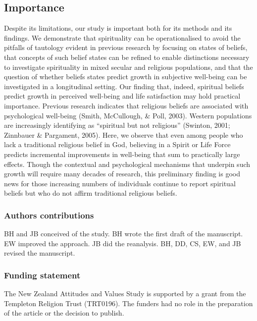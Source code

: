 \documentclass[
  english,
  man,floatsintext]{apa6}
\begin{document}
\hypertarget{importance}{%
\subsection{Importance}\label{importance}}

Despite its limitations, our study is important both for its methods and its findings. We demonstrate that spirituality can be operationalised to avoid the pitfalls of tautology evident in previous research by focusing on states of beliefs, that concepts of such belief states can be refined to enable distinctions necessary to investigate spirituality in mixed secular and religious populations, and that the question of whether beliefs states predict growth in subjective well-being can be investigated in a longitudinal setting. Our finding that, indeed, spiritual beliefs predict growth in perceived well-being and life satisfaction may hold practical importance. Previous research indicates that religious beliefs are associated with psychological well-being (Smith, McCullough, \& Poll, 2003). Western populations are increasingly identifying as ``spiritual but not religious'' (Swinton, 2001; Zinnbauer \& Pargament, 2005). Here, we observe that even among people who lack a traditional religious belief in God, believing in a Spirit or Life Force predicts incremental improvements in well-being that sum to practically large effects. Though the contextual and psychological mechanisms that underpin such growth will require many decades of research, this preliminary finding is good news for those increasing numbers of individuals continue to report spiritual beliefs but who do not affirm traditional religious beliefs.

\hypertarget{authors-contributions}{%
\subsubsection{Authors contributions}\label{authors-contributions}}

BH and JB conceived of the study. BH wrote the first draft of the manuscript. EW improved the approach. JB did the reanalysis. BH, DD, CS, EW, and JB revised the manuscript.

\hypertarget{funding-statement}{%
\subsubsection{Funding statement}\label{funding-statement}}

The New Zealand Attitudes and Values Study is supported by a grant from the Templeton Religion Trust (TRT0196). The funders had no role in the preparation of the article or the decision to publish.
\end{document}
